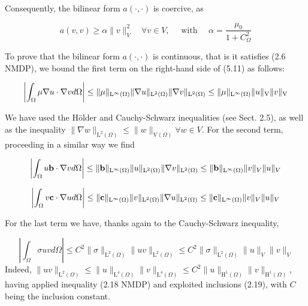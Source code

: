 \documentclass[11pt]{book}
\begin{document}
Consequently, the bilinear form $a(\cdot, \cdot)$ is coercive, as


\begin{equation}
a(v, v) \geq \alpha\|v\|_{V}^{2} \quad \forall v \in V, \quad \text { with } \quad \alpha=\frac{\mu_{0}}{1+C_{\Omega}^{2}} 
\end{equation}


To prove that the bilinear form $a(\cdot, \cdot)$ is continuous, that is it satisfies (2.6 NMDP), we bound the first term on the right-hand side of (5.11) as follows:


\begin{equation}
\left|\int_{\Omega} \mu \nabla u \cdot \nabla v d \Omega\right|  \leq\|\mu\|_{\mathrm{L}^{\infty}(\Omega)}\|\nabla u\|_{\mathrm{L}^{2}(\Omega)}\|\nabla v\|_{\mathrm{L}^{2}(\Omega)}  \\
 \leq\|\mu\|_{\mathrm{L}^{\infty}(\Omega)}\|u\|_{\mathrm{V}}\|v\|_{\mathrm{V}}
\end{equation}


We have used the Hölder and Cauchy-Schwarz inequalities (see Sect. 2.5), as well as the inequality $\|\nabla w\|_{\mathrm{L}^{2}(\Omega)} \leq\|w\|_{\mathrm{V}(\Omega)} \forall w \in V$. For the second term, proceeding in a similar way we find


\begin{equation}
\left|\int_{\Omega} u \mathbf{b} \cdot \nabla v d \Omega\right|  \leq\|\mathbf{b}\|_{\mathrm{L}^{\infty}(\Omega)}\|u\|_{\mathrm{L}^{2}(\Omega)}\|\nabla v\|_{\mathrm{L}^{2}(\Omega)}  \\
 \leq\|\mathbf{b}\|_{\mathrm{L}^{\infty}(\Omega)}\|v\|_{V}\|u\|_{V}
\end{equation}

\begin{equation}
\left|\int_{\Omega} v \mathbf{c} \cdot \nabla u d \Omega\right|  \leq\|\mathbf{c}\|_{\mathrm{L}^{\infty}(\Omega)}\|v\|_{\mathrm{L}^{2}(\Omega)}\|\nabla u\|_{\mathrm{L}^{2}(\Omega)}  \\
 \leq\|\mathbf{c}\|_{\mathrm{L}^{\infty}(\Omega)}\|v\|_{V}\|u\|_{V}
\end{equation}

For the last  term we have, thanks again to the Cauchy-Schwarz inequality,

\begin{equation}
\left|\int_{\Omega} \sigma u v d \Omega\right| \leq C^{2}\|\sigma\|_{\mathrm{L}^{2}(\Omega)}\|u v\|_{\mathrm{L}^{2}(\Omega)} \leq C^{2}\|\sigma\|_{\mathrm{L}^{2}(\Omega)}\|u\|_{V}\|v\|_{V} 
\end{equation}
Indeed, $\|u v\|_{\mathrm{L}^{2}(\Omega)} \leq\|u\|_{\mathrm{L}^{4}(\Omega)}\|v\|_{\mathrm{L}^{4}(\Omega)} \leq C^{2}\|u\|_{\mathrm{H}^{1}(\Omega)}\|v\|_{\mathrm{H}^{1}(\Omega)}$, having applied inequality (2.18 NMDP) and exploited inclusions (2.19), with $C$ being the inclusion constant. \\ \\
\end{document}
